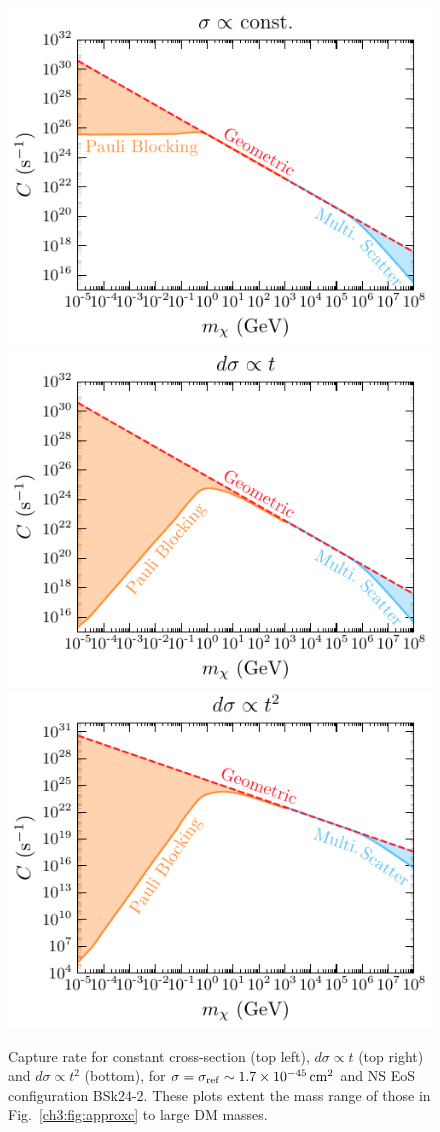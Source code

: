 \begin{figure}[t!bp]
    \centering
    \includegraphics[width=.48\textwidth]{capture_1/capture_rate_n0_fullmassrange.pdf}    
    \includegraphics[width=.48\textwidth]{capture_1/capture_rate_n1_fullmassrange.pdf}       
    \includegraphics[width=.48\textwidth]{capture_1/capture_rate_n2_fullmassrange.pdf}       
    \caption[Capture rate for constant cross-section (top left), $d\sigma\propto t$ (top right) and $d\sigma\propto t^2$ (bottom),  for  $\sigma=\sigmaref\sim 1.7 \times 10^{-45}\cm^2$ and NS EoS configuration BSk24-2.]{Capture rate for constant cross-section (top left), $d\sigma\propto t$ (top right) and $d\sigma\propto t^2$ (bottom),  for  $\sigma=\sigmaref\sim 1.7 \times 10^{-45}\cm^2$ and NS EoS configuration BSk24-2. These plots extent the mass range of those in Fig.~\ref{ch3:fig:approxc} to large DM masses.
    }
    \label{ch3:fig:capturelargemass}
\end{figure}

